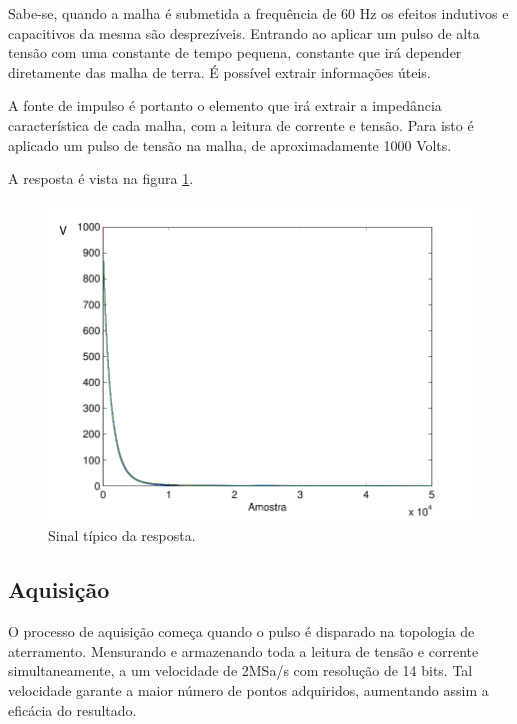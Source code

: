 \documentclass[a4paper, 10pt]{article}
\begin{document}
Sabe-se, quando a malha é submetida a frequência de 60 Hz os efeitos indutivos e 
capacitivos da mesma são desprezíveis. Entrando ao aplicar um pulso de 
alta tensão com uma constante de tempo pequena, constante que irá 
depender diretamente das malha de terra. É possível extrair informações
úteis. 

A fonte de impulso é portanto o elemento que irá extrair a impedância
característica de cada malha, com a leitura de corrente e tensão. 
Para isto é aplicado um pulso de tensão na malha, de aproximadamente
1000 Volts. 

A resposta é vista na figura \ref{fig_sinal}. 

\begin{figure}[!h]
    \caption{\label{fig_sinal} Sinal típico da resposta.}
	    \begin{center}
            \includegraphics[scale=0.5]{../fotos/sinal/sinal-eps-converted-to.pdf}
	    \end{center}
\end{figure}

\subsection{Aquisição}

O processo de aquisição começa quando o pulso é disparado na topologia de aterramento.
Mensurando e armazenando toda a leitura de tensão e corrente simultaneamente, a um velocidade
de 2MSa/s com resolução de 14 bits. 
Tal velocidade garante a maior número de pontos adquiridos, 
aumentando assim a eficácia do resultado.
\end{document}
